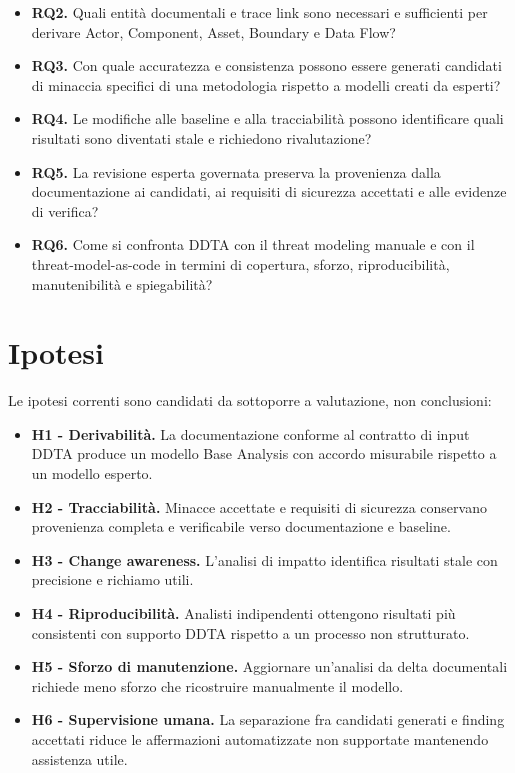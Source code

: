 \documentclass[12pt,a4paper,oneside]{report}
\begin{document}
\begin{itemize}
  \item \textbf{RQ2.} Quali entità documentali e trace link sono necessari e sufficienti per derivare Actor, Component, Asset, Boundary e Data Flow?
  \item \textbf{RQ3.} Con quale accuratezza e consistenza possono essere generati candidati di minaccia specifici di una metodologia rispetto a modelli creati da esperti?
  \item \textbf{RQ4.} Le modifiche alle baseline e alla tracciabilità possono identificare quali risultati sono diventati stale e richiedono rivalutazione?
  \item \textbf{RQ5.} La revisione esperta governata preserva la provenienza dalla documentazione ai candidati, ai requisiti di sicurezza accettati e alle evidenze di verifica?
  \item \textbf{RQ6.} Come si confronta DDTA con il threat modeling manuale e con il threat-model-as-code in termini di copertura, sforzo, riproducibilità, manutenibilità e spiegabilità?
\end{itemize}

\section{Ipotesi}

Le ipotesi correnti sono candidati da sottoporre a valutazione, non conclusioni:

\begin{itemize}
  \item \textbf{H1 - Derivabilità.} La documentazione conforme al contratto di input DDTA produce un modello Base Analysis con accordo misurabile rispetto a un modello esperto.
  \item \textbf{H2 - Tracciabilità.} Minacce accettate e requisiti di sicurezza conservano provenienza completa e verificabile verso documentazione e baseline.
  \item \textbf{H3 - Change awareness.} L'analisi di impatto identifica risultati stale con precisione e richiamo utili.
  \item \textbf{H4 - Riproducibilità.} Analisti indipendenti ottengono risultati più consistenti con supporto DDTA rispetto a un processo non strutturato.
  \item \textbf{H5 - Sforzo di manutenzione.} Aggiornare un'analisi da delta documentali richiede meno sforzo che ricostruire manualmente il modello.
  \item \textbf{H6 - Supervisione umana.} La separazione fra candidati generati e finding accettati riduce le affermazioni automatizzate non supportate mantenendo assistenza utile.
\end{itemize}
\end{document}
